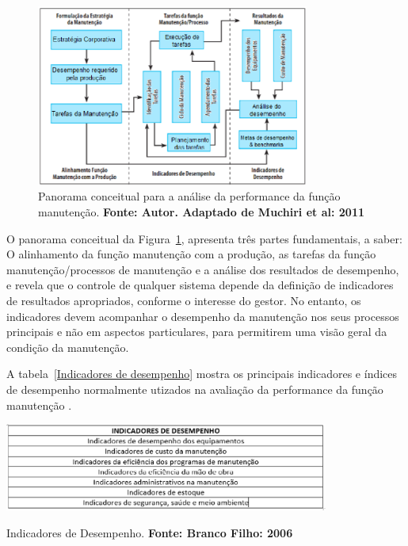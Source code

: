 \graphicspath{{figuras/}}
\begin{figure}[h]
\centering
\includegraphics[width=0.8\textwidth]{desempenho_da_funcao_manutencao.eps}
\caption{Panorama conceitual para a análise da performance da função manutenção. \textbf{Fonte: Autor. Adaptado de Muchiri et al: 2011}}
\label{Desempenho da funcao manutencao}
\end{figure}

O panorama conceitual da Figura~\ref{Desempenho da funcao manutencao}, apresenta três partes fundamentais, a saber: O alinhamento da função manutenção com a produção, as tarefas da função manutenção/processos de manutenção e a análise dos resultados de desempenho, e revela que o controle de qualquer sistema depende da definição de indicadores de resultados apropriados, conforme o interesse do gestor. No entanto, os indicadores devem acompanhar o desempenho da manutenção nos seus processos principais e não em aspectos particulares, para permitirem uma visão geral da condição da manutenção.

A tabela~\ref{Indicadores de desempenho} mostra os principais indicadores e índices de desempenho normalmente utizados na avaliação da performance da função manutenção \cite{branco2006indicadores}.

\graphicspath{{figuras/}}	
\begin{table}[h]
\centering
\includegraphics[width=0.8\textwidth]{IndicadoresBrancoFilho.eps}
\caption{Indicadores de Desempenho. \textbf{Fonte: Branco Filho: 2006}}
\label{Indicadores de desempenho}
\end{table}


